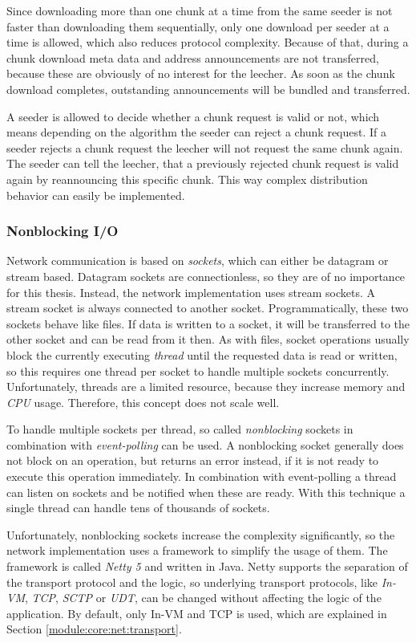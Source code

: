 Since downloading more than one chunk at a time from the same seeder is not faster than downloading them sequentially, only one download per seeder at a time is allowed, which also reduces protocol complexity. Because of that, during a chunk download meta data and address announcements are not transferred, because these are obviously of no interest for the leecher. As soon as the chunk download completes, outstanding announcements will be bundled and transferred.

A seeder is allowed to decide whether a chunk request is valid or not, which means depending on the algorithm the seeder can reject a chunk request. If a seeder rejects a chunk request the leecher will not request the same chunk again. The seeder can tell the leecher, that a previously rejected chunk request is valid again by reannouncing this specific chunk. This way complex distribution behavior can easily be implemented.


\subsubsection{Nonblocking I/O}
Network communication is based on \emph{sockets}, which can either be datagram or stream based. Datagram sockets are connectionless, so they are of no importance for this thesis. Instead, the network implementation uses stream sockets. A stream socket is always connected to another socket. Programmatically, these two sockets behave like files. If data is written to a socket, it will be transferred to the other socket and can be read from it then. As with files, socket operations usually block the currently executing \emph{thread} until the requested data is read or written, so this requires one thread per socket to handle multiple sockets concurrently. Unfortunately, threads are a limited resource, because they increase memory and \emph{CPU} usage. Therefore, this concept does not scale well.

To handle multiple sockets per thread, so called \emph{nonblocking} sockets in combination with \emph{event-polling} can be used. A nonblocking socket generally does not block on an operation, but returns an error instead, if it is not ready to execute this operation immediately. In combination with event-polling a thread can listen on sockets and be notified when these are ready. With this technique a single thread can handle tens of thousands of sockets.

Unfortunately, nonblocking sockets increase the complexity significantly, so the network implementation uses a framework to simplify the usage of them. The framework is called \emph{Netty 5} and written in Java. Netty supports the separation of the transport protocol and the logic, so underlying transport protocols, like \emph{In-VM}, \emph{TCP}, \emph{SCTP} or \emph{UDT}, can be changed without affecting the logic of the application. By default, only In-VM and TCP is used, which are explained in Section \ref{module:core:net:transport}.

